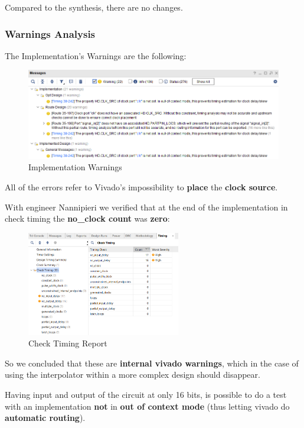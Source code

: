 Compared to the synthesis, there are no changes.

\subsubsection{Warnings Analysis}

The Implementation's Warnings are the following:

\begin{figure}[H]
    \centering
    \includegraphics[width=1\textwidth]{img/Chapter5/ImplementationWarning.png}
    \caption{Implementation Warnings}
    \label{fig:IW}
\end{figure}

All of the errors refer to Vivado's impossibility to \textbf{place} the \textbf{clock source}. 


With engineer Nannipieri we verified that at the end of the implementation in check timing the \textbf{no\_clock count} was \textbf{zero}:

\begin{figure}[H]
    \centering
    \includegraphics[width=0.6\textwidth]{img/Chapter5/NoClockCheck.png}
    \caption{Check Timing Report}
    \label{fig:NCC}
\end{figure}

So we concluded that these are \textbf{internal vivado warnings}, which in the case of using the interpolator within a more complex design should disappear.

Having input and output of the circuit at only 16 bits, is possible to do a test with an implementation \textbf{not} in \textbf{out of context mode} (thus letting vivado do \textbf{automatic routing}).

